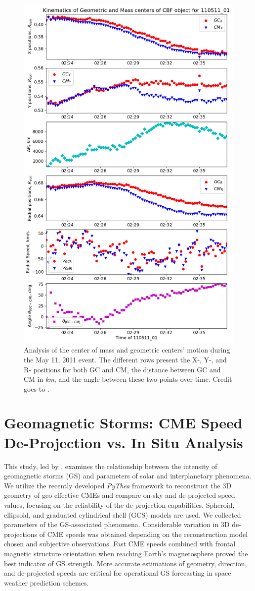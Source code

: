 \begin{figure}[!htp]
	\centering
	\includegraphics[width=0.7\hsize]{chapter2/figs/event_110511_01_centers_of_mass.png}
	\caption{Analysis of the center of mass and geometric centers' motion during the May 11, 2011 event. The different rows present the X-, Y-, and R- positions for both GC and CM, the distance between GC and CM in \textit{km}, and the angle between these two points over time. Credit goes to \citet{stepanyuk_2022}.}
	\label{fig_wavetrack_center_of_mass}
\end{figure}


\section{Geomagnetic Storms: CME Speed De-Projection vs. In Situ Analysis}
This study, led by \citet{miteva_2023}, examines the relationship between the intensity of geomagnetic storms (GS) and parameters of solar and interplanetary phenomena. We utilize the recently developed \textit{PyThea} framework to reconstruct the 3D geometry of geo-effective CMEs and compare on-sky and de-projected speed values, focusing on the reliability of the de-projection capabilities. Spheroid, ellipsoid, and graduated cylindrical shell (GCS) models are used. We collected parameters of the GS-associated phenomena. Considerable variation in 3D de-projections of CME speeds was obtained depending on the reconstruction model chosen and subjective observations. Fast CME speeds combined with frontal magnetic structure orientation when reaching Earth's magnetosphere proved the best indicator of GS strength. More accurate estimations of geometry, direction, and de-projected speeds are critical for operational GS forecasting in space weather prediction schemes.

